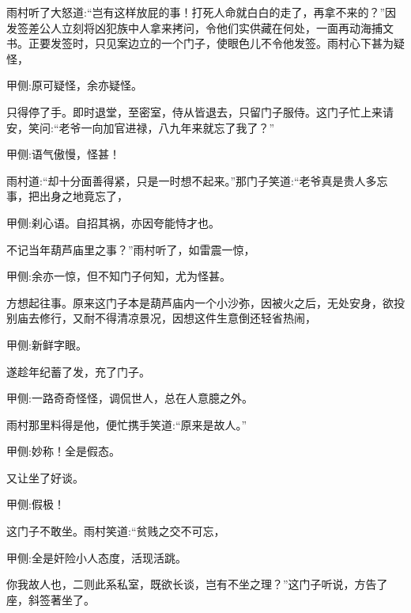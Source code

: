 \begin{parag}
    雨村听了大怒道:“岂有这样放屁的事！打死人命就白白的走了，再拿不来的？”因发签差公人立刻将凶犯族中人拿来拷问，令他们实供藏在何处，一面再动海捕文书。正要发签时，只见案边立的一个门子，使眼色儿不令他发签。雨村心下甚为疑怪，\begin{note}甲侧:原可疑怪，余亦疑怪。\end{note}只得停了手。即时退堂，至密室，侍从皆退去，只留门子服侍。这门子忙上来请安，笑问:“老爷一向加官进禄，八九年来就忘了我了？”\begin{note}甲侧:语气傲慢，怪甚！\end{note}雨村道:“却十分面善得紧，只是一时想不起来。”那门子笑道:“老爷真是贵人多忘事，把出身之地竟忘了，\begin{note}甲侧:刹心语。自招其祸，亦因夸能恃才也。\end{note}不记当年葫芦庙里之事？”雨村听了，如雷震一惊，\begin{note}甲侧:余亦一惊，但不知门子何知，尤为怪甚。\end{note}方想起往事。原来这门子本是葫芦庙内一个小沙弥，因被火之后，无处安身，欲投别庙去修行，又耐不得清凉景况，因想这件生意倒还轻省热闹，\begin{note}甲侧:新鲜字眼。\end{note}遂趁年纪蓄了发，充了门子。\begin{note}甲侧:一路奇奇怪怪，调侃世人，总在人意臆之外。\end{note}雨村那里料得是他，便忙携手笑道:“原来是故人。”\begin{note}甲侧:妙称！全是假态。\end{note}又让坐了好谈。\begin{note}甲侧:假极！\end{note}这门子不敢坐。雨村笑道:“贫贱之交不可忘，\begin{note}甲侧:全是奸险小人态度，活现活跳。\end{note}你我故人也，二则此系私室，既欲长谈，岂有不坐之理？”这门子听说，方告了座，斜签著坐了。
\end{parag}


